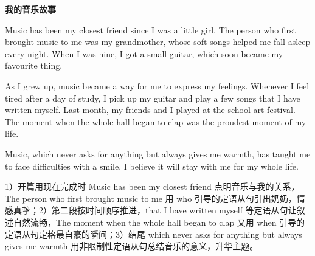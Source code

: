 \documentclass[UTF8,a4paper,11pt,oneside]{ctexbook}
\newcommand{\fanessay}[4]{%
  \Needspace{7\baselineskip}%
  \par\addvspace{2.2ex}%
  \noindent{\color{rulelight}\rule{\linewidth}{0.6pt}}\par
  \nopagebreak
  \addvspace{0.45ex}%
  \noindent{\sffamily\bfseries\color{accent}\large #1}\hspace{0.85em}%
  {\sffamily\bfseries\large\color{mainblue}#2}\par
  \nopagebreak
  \addvspace{0.3ex}%
  {\centering{\bfseries #3}\hspace{0.7em}{\small\color{textgray}（#4）}\par}%
  \addvspace{0.7ex}%
  \nobreak
}
\begin{document}
\fanessay{范文一}{我的音乐故事}{My Music Story}{约144词}
Music has been my closest friend since I was a little girl. The person who first brought music to me was my grandmother, whose soft songs helped me fall asleep every night. When I was nine, I got a small guitar, which soon became my favourite thing.\par
As I grew up, music became a way for me to express my feelings. Whenever I feel tired after a day of study, I pick up my guitar and play a few songs that I have written myself. Last month, my friends and I played at the school art festival. The moment when the whole hall began to clap was the proudest moment of my life.\par
Music, which never asks for anything but always gives me warmth, has taught me to face difficulties with a smile. I believe it will stay with me for my whole life.\par
\begin{analysisbox}
1）开篇用现在完成时 Music has been my closest friend 点明音乐与我的关系，The person who first brought music to me 用 who 引导的定语从句引出奶奶，情感真挚；2）第二段按时间顺序推进，that I have written myself 等定语从句让叙述自然流畅，The moment when the whole hall began to clap 又用 when 引导的定语从句定格最自豪的瞬间；3）结尾 which never asks for anything but always gives me warmth 用非限制性定语从句总结音乐的意义，升华主题。
\par{}
\end{analysisbox}
\end{document}
